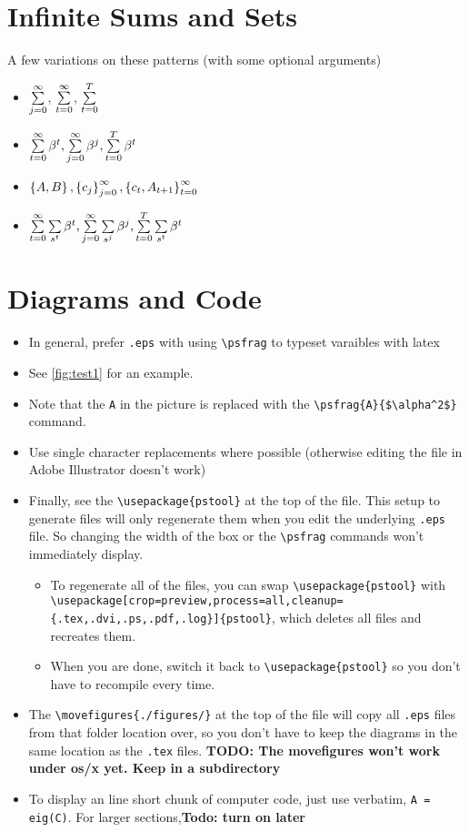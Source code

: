 \documentclass[12pt,etk-draft]{etk-article}
\begin{document}
\section{Infinite Sums and Sets}
A few variations on these patterns (with some optional arguments)
\begin{itemize}
\item $\sumlimits{j}$, $\sumlimits{t}$, $\sumlimits[T]{t}$
\item $\sumpdv{t}, \sumpdv{j}, \sumpdv[T]{t}$
\item $\set{A,B}, \setlimits{j}{c_j}, \setlimits[\infinity]{t}{c_t, A_{t+1}}$
\item $\sumpdvst{t}, \sumpdvst{j}, \sumpdvst[T]{t}$
\end{itemize}

\section{Diagrams and Code}
\begin{itemize}
\item In general, prefer \verb!.eps! with using \verb!\psfrag! to typeset varaibles with latex
\item See \cref{fig:test1} for an example.
\item Note that the \verb!A! in the picture is replaced with the \verb!\psfrag{A}{$\alpha^2$}! command.
\item Use single character replacements where possible (otherwise editing the file in Adobe Illustrator doesn't work)
\item Finally, see the \verb!\usepackage{pstool}! at the top of the file.  This setup to generate files will only regenerate them when you edit the underlying \verb!.eps! file.  So changing the width of the box or the \verb!\psfrag! commands won't immediately display.
\begin{itemize}
\item To regenerate all of the files, you can swap \verb!\usepackage{pstool}! with\\ \verb!\usepackage[crop=preview,process=all,cleanup={.tex,.dvi,.ps,.pdf,.log}]{pstool}!, which deletes all files and recreates them.
\item When you are done, switch it back to \verb!\usepackage{pstool}! so you don't have to recompile every time.
\end{itemize}
\item The \verb!\movefigures{./figures/}! at the top of the file will copy all \verb!.eps! files from that folder location over, so you don't have to keep the diagrams in the same location as the \verb!.tex! files. \textbf{TODO: The movefigures won't work under os/x yet.  Keep in a subdirectory}
\item To display an line short chunk of computer code, just use verbatim, \verb!A = eig(C)!.  For larger sections,\textbf{Todo: turn on later}
\end{itemize}

\end{document}
